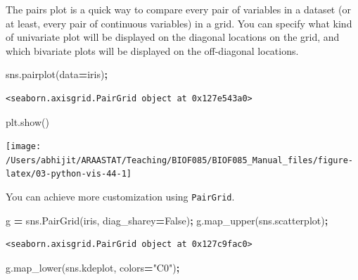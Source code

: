 \documentclass[
  letterpaper,
]{scrbook}
\newenvironment{Shaded}{\begin{snugshade}}{\end{snugshade}}
\newcommand{\NormalTok}[1]{#1}
\newcommand{\OperatorTok}[1]{\textcolor[rgb]{0.81,0.36,0.00}{\textbf{#1}}}
\newcommand{\StringTok}[1]{\textcolor[rgb]{0.31,0.60,0.02}{#1}}
\newcommand{\VariableTok}[1]{\textcolor[rgb]{0.00,0.00,0.00}{#1}}
\begin{document}
The pairs plot is a quick way to compare every pair of variables in a dataset (or at least, every pair of continuous variables) in a grid. You can specify what kind of univariate plot will be displayed on the diagonal locations on the grid, and which bivariate plots will be displayed on the off-diagonal locations.

\begin{Shaded}
\begin{Highlighting}[]
\NormalTok{sns.pairplot(data}\OperatorTok{=}\NormalTok{iris)}\OperatorTok{;}
\end{Highlighting}
\end{Shaded}

\begin{verbatim}
<seaborn.axisgrid.PairGrid object at 0x127e543a0>
\end{verbatim}

\begin{Shaded}
\begin{Highlighting}[]
\NormalTok{plt.show()}
\end{Highlighting}
\end{Shaded}

\begin{center}\texttt{[image: /Users/abhijit/ARAASTAT/Teaching/BIOF085/BIOF085\_Manual\_files/figure-latex/03-python-vis-44-1]} \end{center}

You can achieve more customization using \texttt{PairGrid}.

\begin{Shaded}
\begin{Highlighting}[]
\NormalTok{g }\OperatorTok{=}\NormalTok{ sns.PairGrid(iris, diag_sharey}\OperatorTok{=}\VariableTok{False}\NormalTok{)}\OperatorTok{;}
\NormalTok{g.map_upper(sns.scatterplot)}\OperatorTok{;}
\end{Highlighting}
\end{Shaded}

\begin{verbatim}
<seaborn.axisgrid.PairGrid object at 0x127c9fac0>
\end{verbatim}

\begin{Shaded}
\begin{Highlighting}[]
\NormalTok{g.map_lower(sns.kdeplot, colors}\OperatorTok{=}\StringTok{"C0"}\NormalTok{)}\OperatorTok{;}
\end{Highlighting}
\end{Shaded}
\end{document}
